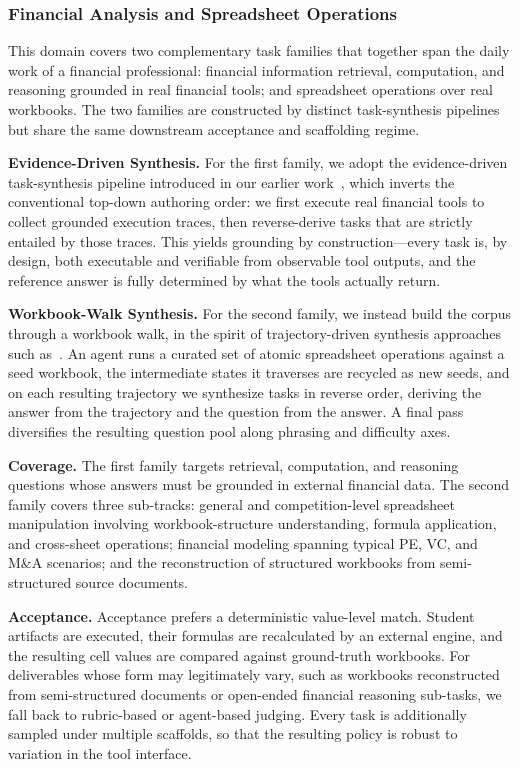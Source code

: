 \subsubsection{Financial Analysis and Spreadsheet Operations}

This domain covers two complementary task families that together span the daily work of a financial professional: financial information retrieval, computation, and reasoning grounded in real financial tools; and spreadsheet operations over real workbooks. The two families are constructed by distinct task-synthesis pipelines but share the same downstream acceptance and scaffolding regime.

\noindent \textbf{Evidence-Driven Synthesis.} For the first family, we adopt the evidence-driven task-synthesis pipeline introduced in our earlier work~\citep{chen2026dive}, which inverts the conventional top-down authoring order: we first execute real financial tools to collect grounded execution traces, then reverse-derive tasks that are strictly entailed by those traces. This yields grounding by construction---every task is, by design, both executable and verifiable from observable tool outputs, and the reference answer is fully determined by what the tools actually return.

\noindent \textbf{Workbook-Walk Synthesis.} For the second family, we instead build the corpus through a workbook walk, in the spirit of trajectory-driven synthesis approaches such as~\citep{liu2025webexplorer}. An agent runs a curated set of atomic spreadsheet operations against a seed workbook, the intermediate states it traverses are recycled as new seeds, and on each resulting trajectory we synthesize tasks in reverse order, deriving the answer from the trajectory and the question from the answer. A final pass diversifies the resulting question pool along phrasing and difficulty axes.

\noindent \textbf{Coverage.} The first family targets retrieval, computation, and reasoning questions whose answers must be grounded in external financial data. The second family covers three sub-tracks: general and competition-level spreadsheet manipulation involving workbook-structure understanding, formula application, and cross-sheet operations; financial modeling spanning typical PE, VC, and M\&A scenarios; and the reconstruction of structured workbooks from semi-structured source documents.

\noindent \textbf{Acceptance.} Acceptance prefers a deterministic value-level match. Student artifacts are executed, their formulas are recalculated by an external engine, and the resulting cell values are compared against ground-truth workbooks. For deliverables whose form may legitimately vary, such as workbooks reconstructed from semi-structured documents or open-ended financial reasoning sub-tasks, we fall back to rubric-based or agent-based judging. Every task is additionally sampled under multiple scaffolds, so that the resulting policy is robust to variation in the tool interface.

